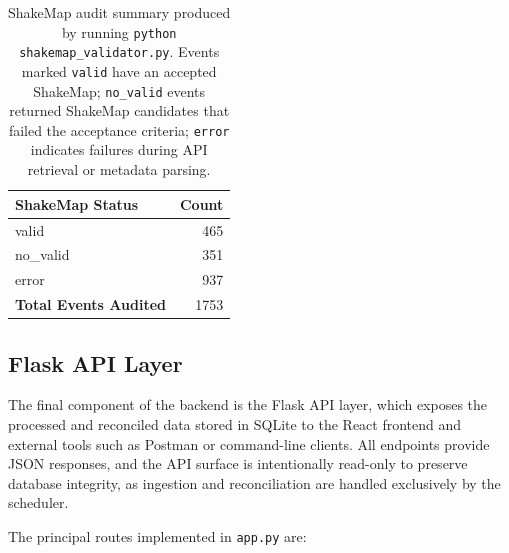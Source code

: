 \documentclass[12pt]{article}
\begin{document}
\begin{table}[H]
\centering
\begin{tabular}{l r}
\hline
\textbf{ShakeMap Status} & \textbf{Count} \\
\hline
valid          & 465 \\
no\_valid      & 351 \\
error          & 937 \\
\hline
\textbf{Total Events Audited} & 1753 \\
\hline
\end{tabular}
\caption{ShakeMap audit summary produced by running 
\texttt{python shakemap\_validator.py}. 
Events marked \texttt{valid} have an accepted ShakeMap; 
\texttt{no\_valid} events returned ShakeMap candidates that failed the acceptance criteria; 
\texttt{error} indicates failures during API retrieval or metadata parsing.}
\label{tab:shakemap-audit}
\end{table}

\subsection{Flask API Layer}

The final component of the backend is the Flask API layer, which exposes the processed and reconciled data stored in SQLite to the React frontend and external tools such as Postman or command-line clients. All endpoints provide JSON responses, and the API surface is intentionally read-only to preserve database integrity, as ingestion and reconciliation are handled exclusively by the scheduler.

The principal routes implemented in \texttt{app.py} are:
\end{document}
